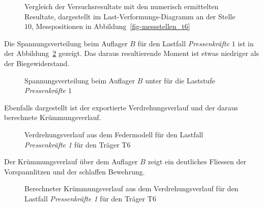 \documentclass[
  11pt,
  letterpaper,
]{scrreprt}
\begin{document}
\begin{figure}[H]


\caption{\label{fig-p_w10_vergleich}Vergleich der Versuchsresultate mit
den numerisch ermittelten Resultate, dargestellt im
Last-Verformungs-Diagramm an der Stelle \(10\), Messpositionen in
Abbildung~\ref{fig-messstellen_t6}}

\end{figure}%

Die Spannungsverteilung beim Auflager \(B\) für den Lastfall
\emph{Pressenkräfte \(1\)} ist in der
Abbildung~\ref{fig-spannungsverteilung_ls8} gezeigt. Das daraus
resultierende Moment ist etwas niedriger als der Biegewiderstand.

\begin{figure}[H]


\caption{\label{fig-spannungsverteilung_ls8}Spannungsverteilung beim
Auflager \(B\) unter für die Laststufe \emph{Pressenkräfte \(1\)}}

\end{figure}%

Ebenfalls dargestellt ist der exportierte Verdrehungsverlauf und der
daraus berechnete Krümmungsverlauf.

\begin{figure}[H]


\caption{\label{fig-phi-max-t6_l8}Verdrehungsverlauf aus dem Federmodell
für den Lastfall \emph{Pressenkräfte 1} für den Träger T6}

\end{figure}%

Der Krümmungsverlauf über dem Auflager \(B\) zeigt ein deutliches
Fliessen der Vorspannlitzen und der schlaffen Bewehrung.

\begin{figure}[H]


\caption{\label{fig-chi-max-t6l8}Berechneter Krümmungsverlauf aus dem
Verdrehungsverlauf für den Lastfall \emph{Pressenkräfte 1} für den
Träger T6}

\end{figure}%
\end{document}
